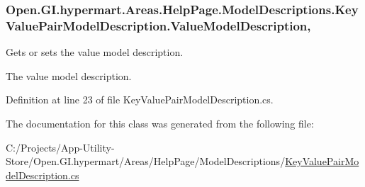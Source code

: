 \subsubsection[{Value\+Model\+Description}]{ Open.\+G\+I.\+hypermart.\+Areas.\+Help\+Page.\+Model\+Descriptions.\+Key\+Value\+Pair\+Model\+Description.\+Value\+Model\+Description\hspace{0.3cm}{\ttfamily [get]}, {\ttfamily [set]}}\label{class_open_1_1_g_i_1_1hypermart_1_1_areas_1_1_help_page_1_1_model_descriptions_1_1_key_value_pair_model_description_a5bcf18b1e78df6ba8b0cbc001a11ace6}


Gets or sets the value model description. 

The value model description. 

Definition at line 23 of file Key\+Value\+Pair\+Model\+Description.\+cs.



The documentation for this class was generated from the following file\+:\begin{DoxyCompactItemize}
\item 
C\+:/\+Projects/\+App-\/\+Utility-\/\+Store/\+Open.\+G\+I.\+hypermart/\+Areas/\+Help\+Page/\+Model\+Descriptions/\hyperlink{_key_value_pair_model_description_8cs}{Key\+Value\+Pair\+Model\+Description.\+cs}\end{DoxyCompactItemize}
